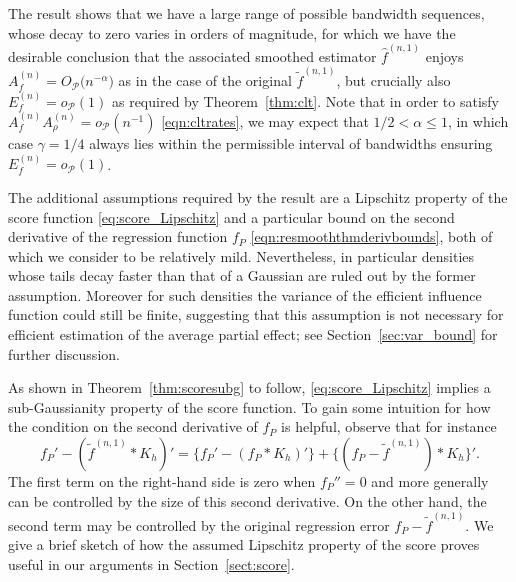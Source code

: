 \documentclass[aos]{imsart}
\newcommand{\R}{\mathbb{R}}
\begin{document}
The result shows that
we have a large range of possible bandwidth sequences, whose decay to zero varies in orders of magnitude, for which we have the desirable conclusion that the associated
smoothed estimator $\hat{f}^{(n,1)}$ enjoys $A_f^{(n)} = O_{\mathcal{P}}\big(n^{-\alpha}\big)$  as in the case of the original $\tilde{f}^{(n,1)}$, but crucially also $E_f^{(n)} = o_{\mathcal{P}}(1)$ as required by Theorem~\ref{thm:clt}. Note that in order to satisfy $A_f^{(n)}A_\rho^{(n)} = o_{\mathcal{P}}(n^{-1})$ \eqref{eqn:cltrates}, we may expect that $1/2 < \alpha \leq 1$, in which case $\gamma=1/4$ always lies within the permissible interval of bandwidths ensuring $E_f^{(n)} = o_{\mathcal{P}}(1)$.

The additional assumptions required by the result are a Lipschitz property of the score function \eqref{eq:score_Lipschitz} and a particular bound on the second derivative of the regression function $f_P$ \eqref{eqn:resmooththmderivbounds}, both of which we consider to be relatively mild. Nevertheless, in particular densities whose tails decay faster than that of a Gaussian are ruled out by the former assumption. Moreover for such densities the variance of the efficient influence function could still be finite, suggesting that this assumption is not necessary for efficient estimation of the average partial effect; see Section~\ref{sec:var_bound} for further discussion.


As  shown in  Theorem~\ref{thm:scoresubg} to follow, \eqref{eq:score_Lipschitz} implies a sub-Gaussianity property of the score function. To gain some intuition for how the condition on the second derivative of $f_P$ is helpful, observe that for instance
\[
f_P' - (\tilde{f}^{(n,1)} * K_h)' = \{f_P' - (f_P*K_h)'\} + \{(f_P-\tilde{f}^{(n,1)}) * K_h\}'.
\]
The first term on the right-hand side is zero when $f_P''=0$ and more generally can be controlled by the size of this second derivative. On the other hand, the second term may be controlled by the original regression error $f_P-\tilde{f}^{(n,1)}$. We give a brief sketch of how the assumed Lipschitz property of the score proves useful in our arguments in Section~\ref{sect:score}. 
\end{document}
